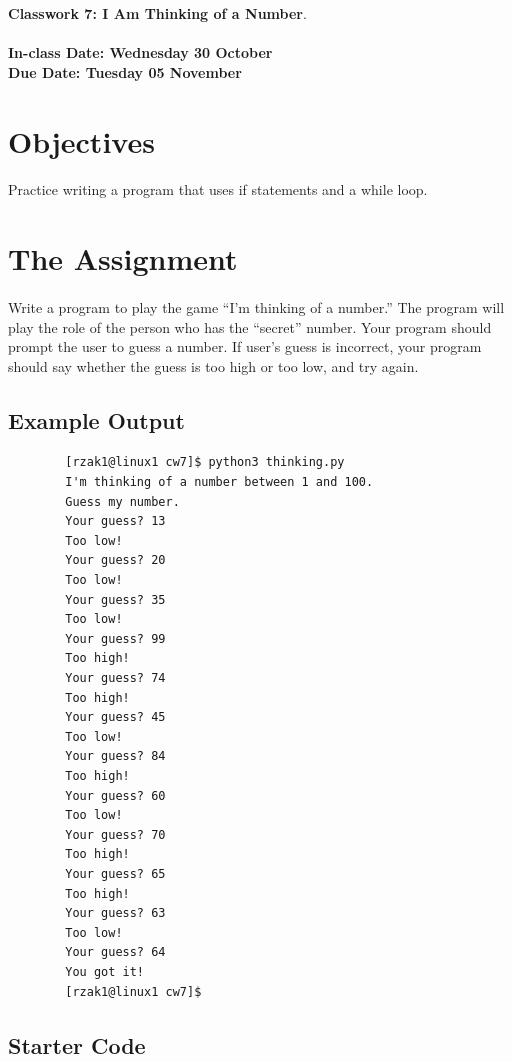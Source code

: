 \documentclass[letter,10pt]{article}
\begin{document}
    
    \huge
    \textbf{Classwork 7: I Am Thinking of a Number}.
    \normalsize
    \\ ~~ \\
    \textbf{In-class Date: Wednesday 30 October} \\
    \textbf{Due Date: Tuesday 05 November}
    
    \section*{Objectives}
    \paragraph{}Practice writing a program that uses if statements and a while loop.
    
    \section*{The Assignment}
    \paragraph{}Write a program to play the game ``I'm thinking of a number.'' The program will play the role of the person who has the ``secret'' number. Your program should prompt the user to guess a number. If user's guess is incorrect, your program should say whether the guess is too high or too low, and try again.
    
    \subsection*{Example Output}
    \begin{verbatim}
        [rzak1@linux1 cw7]$ python3 thinking.py
        I'm thinking of a number between 1 and 100.
        Guess my number.
        Your guess? 13
        Too low!
        Your guess? 20
        Too low!
        Your guess? 35
        Too low!
        Your guess? 99
        Too high!
        Your guess? 74
        Too high!
        Your guess? 45
        Too low!
        Your guess? 84
        Too high!
        Your guess? 60
        Too low!
        Your guess? 70
        Too high!
        Your guess? 65
        Too high!
        Your guess? 63
        Too low!
        Your guess? 64
        You got it!
        [rzak1@linux1 cw7]$ 
    \end{verbatim}
    
    \subsection*{Starter Code}
\end{document}
